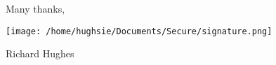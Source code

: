\documentclass[a4paper,10pt,oneside]{letter}
\begin{document}
\vspace{10px}
\hspace{50px}Many thanks,

\hspace{75px}\texttt{[image: /home/hughsie/Documents/Secure/signature.png]}

\hspace{100px}Richard Hughes

\vspace{20px}
\end{document}

